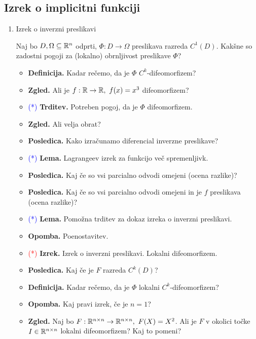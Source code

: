 \subsection{Izrek o implicitni funkciji}
\begin{enumerate}
    \item Izrek o inverzni preslikavi
    
    Naj bo $D, \Omega \subseteq \mathbb{R}^n$ odprti, $\Phi: D \to \Omega$ preslikava razreda $C^1(D)$. Kakšne so zadostni pogoji za (lokalno) obrnljivost preslikave $\Phi$?
    
    \begin{itemize}
        \item \textbf{Definicija.} Kadar rečemo, da je $\Phi$ $C^k$-difeomorfizem?
        \item \textbf{Zgled.} Ali je $f: \mathbb{R} \to \mathbb{R}, \ f(x) = x^3$ difeomorfizem?        
        \item \textcolor{blue}{(*)} \textbf{Trditev.} Potreben pogoj, da je $\Phi$ difeomorfizem.
        \item \textbf{Zgled.} Ali velja obrat? 
        \item \textbf{Posledica.} Kako izračunamo diferencial inverzne preslikave?
        \item \textcolor{blue}{(*)} \textbf{Lema.} Lagrangeev izrek za funkcijo več spremenljivk.
        \item \textbf{Posledica.} Kaj če so vsi parcialno odvodi omejeni (ocena razlike)?
        \item \textbf{Posledica.} Kaj če so vsi parcialno odvodi omejeni in je \(f\) preslikava (ocena razlike)?
        \item \textcolor{blue}{(*)} \textbf{Lema.} Pomožna trditev za dokaz izreka o inverzni preslikavi.
        \item \textbf{Opomba.} Poenostavitev.
        \item \textcolor{red}{(*)} \textbf{Izrek.} Izrek o inverzni preslikavi. Lokalni difeomorfizem.
        \item \textbf{Posledica.} Kaj če je $F$ razreda $C^k(D)$?
        \item \textbf{Definicija.} Kadar rečemo, da je $\Phi$ lokalni $C^k$-difeomorfizem?
        \item \textbf{Opomba.} Kaj pravi izrek, če je $n = 1$?
        \item \textbf{Zgled.}  Naj bo $F: \mathbb{R}^{n \times n} \to \mathbb{R}^{n \times n}, \ F(X) = X^2$. Ali je $F$ v okolici točke $I \in \mathbb{R}^{n \times n}$ lokalni difeomorfizem? Kaj to pomeni?
    \end{itemize}
    


\end{enumerate}
